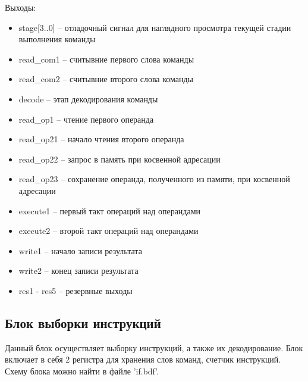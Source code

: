 Выходы:
\begin{itemize}
    \item stage[3..0] -- отладочный сигнал для наглядного просмотра текущей стадии выполнения команды
    \item read\_com1 -- считывние первого слова команды
    \item read\_com2 -- считывние второго слова команды
    \item decode -- этап декодирования команды
    \item read\_op1 -- чтение первого операнда
    \item read\_op21 -- начало чтения второго операнда
    \item read\_op22 -- запрос в память при косвенной адресации
    \item read\_op23 -- сохранение операнда, полученного из памяти, при косвенной адресации
    \item execute1 -- первый такт операций над операндами
    \item execute2 -- второй такт операций над операндами
    \item write1 -- начало записи результата
    \item write2 -- конец записи результата
    \item res1 - res5 -- резервные выходы
\end{itemize}

\subsection{Блок выборки инструкций}
Данный блок осуществляет выборку инструкций, а также их декодирование.
Блок включает в себя 2 регистра для хранения слов команд, счетчик инструкций.
Схему блока можно найти в файле 'if.bdf'.

